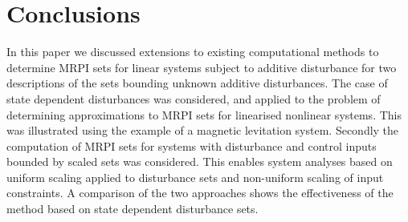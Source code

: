 \documentclass[letterpaper, 10pt, conference]{ieeeconf} %
\begin{document}
\section{Conclusions}\label{sec:conclusions}
%
In this paper we discussed extensions to existing computational methods to determine MRPI sets for linear systems subject to additive disturbance for two descriptions of the sets bounding unknown additive disturbances. The case of state dependent disturbances was considered, and applied to the problem of determining approximations to MRPI sets for linearised nonlinear systems. This was illustrated using the example of a magnetic levitation system. Secondly the computation of MRPI sets for systems with disturbance and control inputs bounded by scaled sets was considered. This enables system analyses based on uniform scaling applied to disturbance sets and non-uniform scaling of input constraints. A comparison of the two approaches shows the effectiveness of the method based on state dependent disturbance sets. 

 
%
\end{document}
